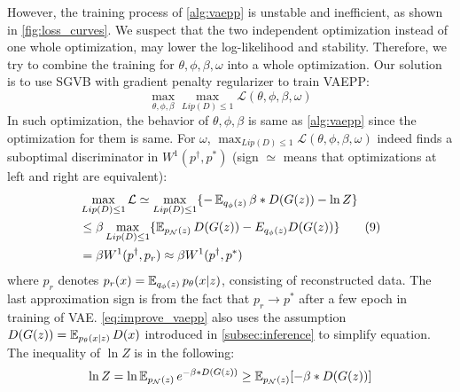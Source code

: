 However, the training process of \cref{alg:vaepp} is unstable and inefficient, as shown in \cref{fig:loss_curves}. 
We suspect that the two independent optimization instead of one whole optimization, may lower the log-likelihood and stability. Therefore, we try to combine the training for $\theta, \phi, \beta, \omega$ into a whole optimization. 
Our solution is to use SGVB with gradient penalty regularizer to train VAEPP:
\begin{equation*}
	\max_{\theta, \phi, \beta} \max_{Lip(D) \leq 1} \mathcal{L}(\theta, \phi, \beta, \omega) 
\end{equation*} 
In such optimization, the behavior of $\theta, \phi, \beta$ is same as \cref{alg:vaepp} since the optimization for them is same. For $\omega$, 
$\max_{Lip(D) \leq 1} \mathcal{L}(\theta, \phi, \beta, \omega)$ indeed finds a suboptimal discriminator in $W^1(p^\dag, p^*)$ (sign $\simeq$ means that optimizations at left and right are equivalent):
\begin{align*}\label{eq:improve_vaepp}
	&\max_{Lip(D) \leq 1} \mathcal{L} \simeq \max_{Lip(D) \leq 1} \{ -\operatorname{\mathbb{E}}_{q_\phi(z)} \beta*D(G(z)) - \ln Z \}\\ 
	&\leq \beta \max_{Lip(D) \leq 1} \{ \operatorname{\mathbb{E}}_{p_\mathcal{N}(z)} D(G(z)) - E_{q_\phi(z)} D(G(z)) \} \tag{9} \\
	&= \beta W^1(p^\dag, p_r) \approx \beta W^1(p^\dag, p^*) 
\end{align*}
where $p_r$ denotes $p_r(x) = \operatorname{\mathbb{E}}_{q_\phi(z)} p_\theta(x|z)$, consisting of reconstructed data. 
The last approximation sign is from the fact that $p_r \rightarrow p^*$ after a few epoch in training of VAE. \cref{eq:improve_vaepp} also uses the assumption $D(G(z)) = \operatorname{\mathbb{E}}_{p_\theta(x|z)} D(x)$ introduced in \cref{subsec:inference} to simplify equation. The inequality of $\ln Z$ is in the following:
\begin{equation*}
	\ln Z = \ln \operatorname{\mathbb{E}}_{p_\mathcal{N}(z)} e^{- \beta * D(G(z))} \geq \operatorname{\mathbb{E}}_{p_\mathcal{N}(z)} [- \beta * D(G(z))]
\end{equation*}

